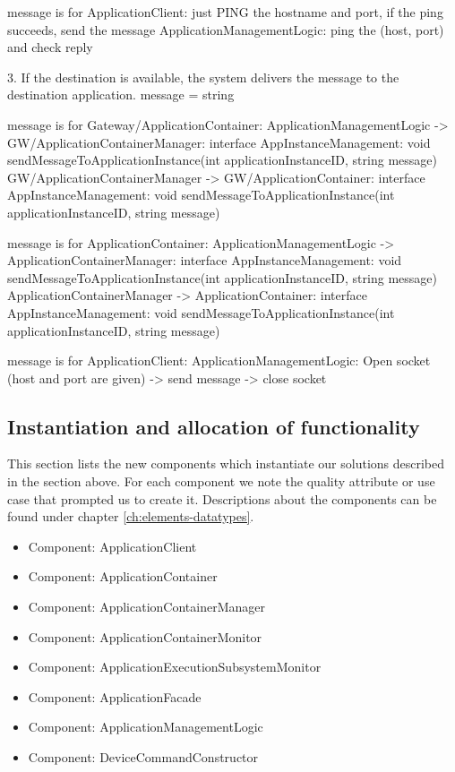                 message is for ApplicationClient:
                    just PING the hostname and port, if the ping succeeds, send the message
                        ApplicationManagementLogic: ping the (host, port) and check reply

            3. If the destination is available, the system delivers the message to the destination application.
                message = string

                message is for Gateway/ApplicationContainer:
                    ApplicationManagementLogic -> GW/ApplicationContainerManager: interface AppInstanceManagement: void sendMessageToApplicationInstance(int applicationInstanceID, string message)
                    GW/ApplicationContainerManager -> GW/ApplicationContainer: interface AppInstanceManagement: void sendMessageToApplicationInstance(int applicationInstanceID, string message)

                message is for ApplicationContainer:
                    ApplicationManagementLogic -> ApplicationContainerManager: interface AppInstanceManagement: void sendMessageToApplicationInstance(int applicationInstanceID, string message)
                    ApplicationContainerManager -> ApplicationContainer: interface AppInstanceManagement: void sendMessageToApplicationInstance(int applicationInstanceID, string message)

                message is for ApplicationClient:
                    ApplicationManagementLogic: Open socket (host and port are given) -> send message -> close socket

\subsection{Instantiation and allocation of functionality}
    This section lists the new components which instantiate our solutions
    described in the section above. For each component we note the quality
    attribute or use case that prompted us to create it. Descriptions about
    the components can be found under chapter \ref{ch:elements-datatypes}. \\

    \begin{itemize}
        \item Component: ApplicationClient
        \item Component: ApplicationContainer
        \item Component: ApplicationContainerManager
        \item Component: ApplicationContainerMonitor
        \item Component: ApplicationExecutionSubsystemMonitor
        \item Component: ApplicationFacade
        \item Component: ApplicationManagementLogic
        \item Component: DeviceCommandConstructor
    \end{itemize}


